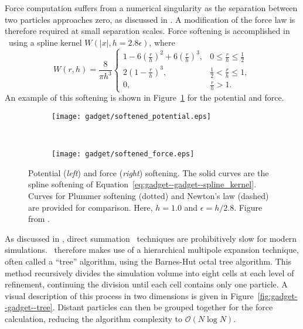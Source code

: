 Force computation suffers from a numerical singularity as the separation between two particles approaches zero, as discussed in .  A modification of the force law is therefore required at small separation scales.  Force softening is accomplished in \gadgettwo\ using a spline kernel \citep{1985A&A...149..135M} $W(|x|, h = 2.8 \epsilon)$, where
\begin{equation} \label{eq:gadget--gadget--spline_kernel}
	W(r,h) = \frac{8}{\pi h^{3}}
	\begin{cases}
		1 - 6 \left( \frac{r}{h} \right)^{2} + 6 \left( \frac{r}{h} \right)^{3}, & 0 \leq \frac{r}{h} \leq \frac{1}{2} \\
		2 \left( 1 - \frac{r}{h} \right)^{3},                                    & \frac{1}{2} < \frac{r}{h} \leq 1, \\
		0,                                                                       & \frac{r}{h} > 1.
	\end{cases}
\end{equation}
An example of this softening is shown in Figure~\ref{fig:gadget--gadget--softening} for the potential and force.

\begin{figure}[t]
	\centering
	\begin{subfigure}{}
		\texttt{[image: gadget/softened\_potential.eps]}
	\end{subfigure}
	~
	\begin{subfigure}{}
		\texttt{[image: gadget/softened\_force.eps]}
	\end{subfigure}
	\caption[Potential and force softening.]{Potential (\emph{left}) and force (\emph{right}) softening.  The solid curves are the spline softening of Equation~\ref{eq:gadget--gadget--spline_kernel}.  Curves for Plummer softening (dotted) and Newton's law (dashed) are provided for comparison.  Here, $h = 1.0$ and $\epsilon = h/2.8$.  Figure from \citet{2001NewA....6...79S}.}
	\label{fig:gadget--gadget--softening}
\end{figure}

As discussed in , direct summation \nbody\ techniques are prohibitively slow for modern simulations.  \gadgettwo\ therefore makes use of a hierarchical multipole expansion technique, often called a ``tree'' algorithm, using the Barnes-Hut octal tree \citep{1986Natur.324..446B} algorithm.  This method recursively divides the simulation volume into eight cells at each level of refinement, continuing the division until each cell contains only one particle.  A visual description of this process in two dimensions is given in Figure~\ref{fig:gadget--gadget--tree}.  Distant particles can then be grouped together for the force calculation, reducing the algorithm complexity to $\mathcal{O} (N \log N)$.

